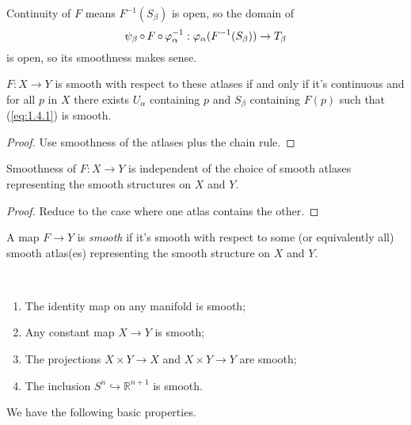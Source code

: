 \documentclass[a4paper,11pt]{article}
\begin{document}
	\begin{rmk}
		Continuity of $F$ means $F^{-1}(S_\beta)$ is open, so the domain of 
		\begin{equation}
			\psi_\beta \operatorname{\circ} F \operatorname{\circ} \varphi_\alpha^{-1} : \varphi_\alpha (F^{-1}(S_\beta)) \to T_\beta
			\label{eq:1.4.1}
		\end{equation}
		is open, so its smoothness makes sense.
	\end{rmk}

	\begin{lem}
		$F: X\to Y$ is smooth with respect to these atlases if and only if it's continuous and for all $p$ in $X$ there exists $U_\alpha$ containing $p$ and $S_\beta$ containing $F(p)$ such that (\ref{eq:1.4.1}) is smooth.
	\end{lem}
	\begin{proof}
		Use smoothness of the atlases plus the chain rule.
	\end{proof}

	\begin{cor}
		Smoothness of $F: X \to Y$ is independent of the choice of smooth atlases representing the smooth structures on $X$ and $Y$.
	\end{cor}
	\begin{proof}
		Reduce to the case where one atlas contains the other.
	\end{proof}

	\begin{defi}
		A map $F \to Y$ is \emph{smooth} if it's smooth with respect to some (or equivalently all) smooth atlas(es) representing the smooth structure on $X$ and $Y$.
	\end{defi}

	\begin{ex}
		\ 
		\begin{enumerate}
			\item The identity map on any manifold is smooth;
			\item Any constant map $X \to Y$ is smooth;
			\item The projections $X \times Y \to X$ and $X \times Y \to Y$ are smooth;
			\item The inclusion $S^n \hookrightarrow \mathbb{R}^{n+1}$ is smooth.
		\end{enumerate}
	\end{ex}

	We have the following basic properties.
\end{document}
